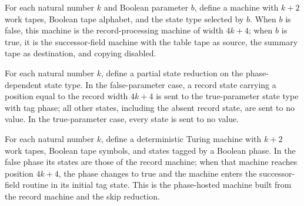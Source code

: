 \begin{definition}
\label{Turing.StepBlock.skipPart}
\leanok
{}
For each natural number $k$ and Boolean parameter $b$, define a machine with $k+2$ work
tapes, Boolean tape alphabet, and the state type selected by $b$. When $b$ is false,
this machine is the record-processing machine of width $4k+4$; when $b$ is true, it is
the successor-field machine with the table tape as source, the summary tape as
destination, and copying disabled.
\end{definition}

\begin{definition}
\label{Turing.StepBlock.skipRed}
\leanok
{}
For each natural number $k$, define a partial state reduction on the phase-dependent
state type. In the false-parameter case, a record state carrying a position equal to the
record width $4k+4$ is sent to the true-parameter state type with tag phase; all other
states, including the absent record state, are sent to no value. In the true-parameter
case, every state is sent to no value.
\end{definition}

\begin{definition}
\label{Turing.StepBlock.recordSkipTM}
\leanok
{}
For each natural number $k$, define a deterministic Turing machine with $k+2$ work
tapes, Boolean tape symbols, and states tagged by a Boolean phase. In the false phase
its states are those of the record machine; when that machine reaches position $4k+4$,
the phase changes to true and the machine enters the successor-field routine in its
initial tag state. This is the phase-hosted machine built from the record machine and
the skip reduction.
\end{definition}


